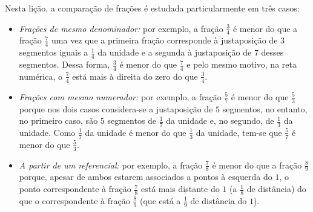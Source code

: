 \begin{multicols}{2}
\begin{center}
\end{center}

Nesta lição, a comparação de frações é estudada particularmente em três casos:
\begin{itemize}
\item \textit{Frações de mesmo denominador:} por exemplo, a fração $\frac{3}{4}$ é menor do que a fração $\frac{7}{4}$ uma vez que a primeira fração corresponde à justaposição de $3$ segmentos iguais a $\frac{1}{4}$ da unidade e a segunda à justaposição de $7$ desses segmentos. Dessa forma, $\frac{3}{4}$ é menor do que $\frac{7}{4}$ e pelo mesmo motivo, na reta numérica, o $\frac{7}{4}$ está mais à direita do zero do que $\frac{3}{4}$.
\item \textit{Frações com mesmo numerador:}  por exemplo, a fração $\frac{5}{7}$ é menor do que $\frac{5}{3}$ porque nos dois casos considera-se a justaposição de $5$ segmentos, no entanto, no primeiro caso, são $5$ segmentos de $\frac{1}{7}$ da unidade e, no segundo, de $\frac{1}{3}$ da unidade. Como $\frac{1}{7}$ da unidade é menor do que $\frac{1}{3}$ da unidade, tem-se que $\frac{5}{7}$ é menor do que $\frac{5}{3}$.
\item \textit{A partir de um referencial:} por exemplo, a fração $\frac{7}{8}$ é menor do que a fração $\frac{8}{9}$ porque, apesar de ambos estarem associados a pontos à esquerda do $1$, o ponto correspondente à fração $\frac{7}{8}$ está mais distante do $1$ (a $\frac{1}{8}$ de distância) do que o correspondente à fração $\frac{8}{9}$ (que está a $\frac{1}{9}$ de distância do $1$).
\end{itemize}


\end{multicols}
